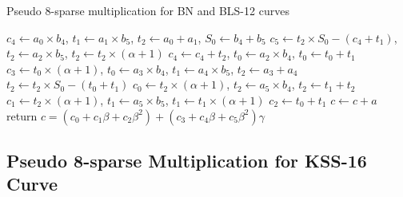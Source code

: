 \begin{algorithm}[ht]
	\caption{Pseudo 8-sparse multiplication for BN and BLS-12 curves}
	\label{sparse_mul}
	\DontPrintSemicolon
	 $c_4\leftarrow a_0\times b_4$, $t_1\leftarrow a_1\times b_5$, $t_2\leftarrow a_0+a_1$, $S_0\leftarrow b_4+b_5$\;
	 $c_5\leftarrow t_2\times S_0-(c_4+t_1)$, $t_2\leftarrow a_2 \times b_5$, $t_2 \leftarrow t_2 \times (\alpha+1)$\;
	 $c_4\leftarrow c_4+t_2$, $t_0 \leftarrow a_2 \times b_4$, $t_0 \leftarrow t_0+t_1$\;
	 $c_3 \leftarrow t_0 \times (\alpha+1)$, $t_0\leftarrow a_3 \times b_4$, $t_1\leftarrow a_4\times b_5$, $t_2\leftarrow a_3+a_4$\;
	 $t_2 \leftarrow t_2 \times S_0-(t_0+t_1)$\;
	 $c_0 \leftarrow t_2 \times (\alpha+1)$, $t_2 \leftarrow a_5 \times b_4$, $t_2 \leftarrow t_1+t_2$\;
	 $c_1 \leftarrow t_2 \times (\alpha+1)$, $t_1 \leftarrow a_5 \times b_5$, $t_1 \leftarrow t_1 \times (\alpha+1)$\;
	 $c_2 \leftarrow t_0+t_1$\;
	 $c\leftarrow c+a$\;
	 return $c=(c_0+c_1\beta+c_2\beta^2)+(c_3+c_4\beta+c_5\beta^2)\gamma$
\end{algorithm}
\vspace{-0.6em}


\subsection{Pseudo 8-sparse Multiplication for KSS-16 Curve}
\label{sec:ch:indo:proposal_8sparse}

